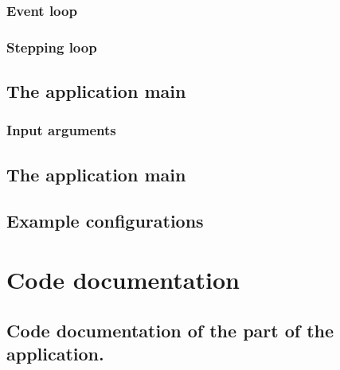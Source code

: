 \documentclass[letterpaper,10pt,english]{sphinxmanual}
\begin{document}
\subsection{Event loop}
\label{\detokenize{IntroAndInstall/components:event-loop}}

\subsection{Stepping loop}
\label{\detokenize{IntroAndInstall/components:stepping-loop}}

\section{The  application main}
\label{\detokenize{IntroAndInstall/components:the-hepemshow-application-main}}

\subsection{Input arguments}
\label{\detokenize{IntroAndInstall/components:input-arguments}}

\section{The  application main}
\label{\detokenize{IntroAndInstall/components:the-hepemshow-datageneration-application-main}}

\section{Example configurations}
\label{\detokenize{IntroAndInstall/components:example-configurations}}
\sphinxstepscope


\chapter{Code documentation}
\label{\detokenize{CodeDoc:code-documentation}}\label{\detokenize{CodeDoc::doc}}
\sphinxstepscope


\section{Code documentation of the  part of the  application.}
\label{\detokenize{Simulation/SimulationCodeDoc:code-documentation-of-the-simulation-part-of-the-hepemshow-application}}\label{\detokenize{Simulation/SimulationCodeDoc::doc}}
\end{document}
